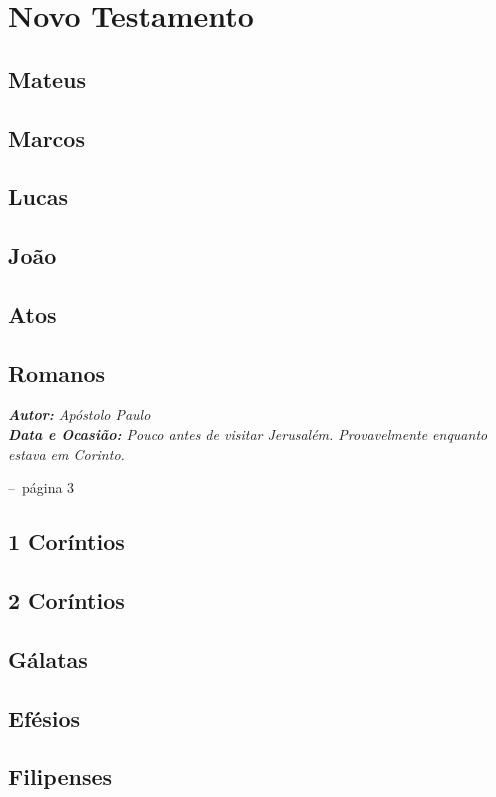 \documentclass[a4paper,11pt,oneside]{book}
\makeatletter
\theoremstyle{definition}
\theoremstyle{break}
\newenvironment{chapquote}[2][2em]
  {\setlength{\@tempdima}{#1}%
   \def\chapquote@author{#2}%
   \parshape 1 \@tempdima \dimexpr\textwidth-2\@tempdima\relax%
   \itshape}
  {\par\normalfont\hfill--\ \chapquote@author\hspace*{\@tempdima}\par\bigskip}
\makeatother
\begin{document}
\part{Novo Testamento}

\chapter{Mateus}
\chapter{Marcos}
\chapter{Lucas}
\chapter{João}
\chapter{Atos}
\chapter{Romanos}

\begin{chapquote}{página 3}
	\textbf{Autor: } Apóstolo Paulo \\
	\textbf{Data e Ocasião: } Pouco antes de visitar Jerusalém. Provavelmente enquanto estava em Corinto.
\end{chapquote}


\chapter{1 Coríntios}
\chapter{2 Coríntios}
\chapter{Gálatas}
\chapter{Efésios}
\chapter{Filipenses}
\end{document}
